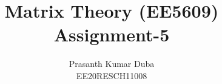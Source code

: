 \documentclass[journal,12pt,twocolumn]{IEEEtran}
\begin{document}
\makeatletter
{}
\makeatother
\let\StandardTheFigure\thefigure
\let\vec\mathbf
\renewcommand{\thefigure}{\theproblem}
\def\putbox#1#2#3{\makebox[0in][l]{\makebox[#1][l]{}\raisebox{\baselineskip}[0in][0in]{\raisebox{#2}[0in][0in]{#3}}}}
     \def\rightbox#1{\makebox[0in][r]{#1}}
     \def\centbox#1{\makebox[0in]{#1}}
     \def\topbox#1{\raisebox{-\baselineskip}[0in][0in]{#1}}
     \def\midbox#1{\raisebox{-0.5\baselineskip}[0in][0in]{#1}}
\vspace{3cm}
\title{Matrix Theory (EE5609) \\ Assignment-5}
\author{Prasanth Kumar Duba \\ EE20RESCH11008}
%
%
%
% 
%
\end{document}
